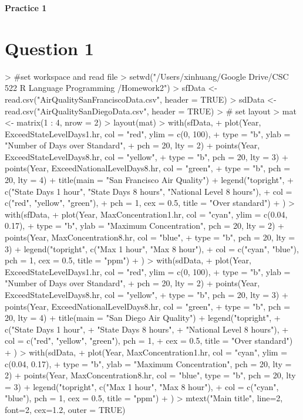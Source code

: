 \documentclass{article}
\begin{document}


\begin{center}
{\bf\Large Practice 1}
\end{center}

\section*{Question 1}
\begin{Schunk}
\begin{Sinput}
> #set workspace and read file
> setwd("/Users/xinhuang/Google Drive/CSC 522 R Language Programming /Homework2")
> sfData <- read.csv("AirQualitySanFranciscoData.csv", header = TRUE)
> sdData <- read.csv("AirQualitySanDiegoData.csv", header = TRUE)
> # set layout
> mat <- matrix(1 : 4, nrow = 2)
> layout(mat)
> with(sfData, {
+     plot(Year, ExceedStateLevelDays1.hr, col = "red", ylim = c(0, 100), 
+          type = "b", ylab = "Number of Days over Standard", 
+          pch = 20, lty = 2)
+     points(Year, ExceedStateLevelDays8.hr, col = "yellow", 
+            type = "b", pch = 20, lty = 3)
+     points(Year, ExceedNationalLevelDays8.hr, col = "green", 
+            type = "b", pch = 20, lty = 4)
+     title(main = "San Francisco Air Quality")
+     legend("topright", 
+            c("State Days 1 hour", "State Days 8 hours", "National Level 8 hours"),
+            col = c("red", "yellow", "green"),
+            pch = 1, cex = 0.5, title = "Over standard")
+ })
> with(sfData, {
+     plot(Year, MaxConcentration1.hr, col = "cyan", ylim = c(0.04, 0.17), 
+          type = "b", ylab = "Maximum Concentration", pch = 20, lty = 2)
+     points(Year, MaxConcentration8.hr, col = "blue", 
+            type = "b", pch = 20, lty = 3)
+     legend("topright", c("Max 1 hour", "Max 8 hour"),
+            col = c("cyan", "blue"), pch = 1, cex = 0.5, title = "ppm")
+ })
> with(sdData, {
+     plot(Year, ExceedStateLevelDays1.hr, col = "red", ylim = c(0, 100), 
+          type = "b", ylab = "Number of Days over Standard",
+          pch = 20, lty = 2)
+     points(Year, ExceedStateLevelDays8.hr, col = "yellow",
+            type = "b", pch = 20, lty = 3)
+     points(Year, ExceedNationalLevelDays8.hr, col = "green", 
+            type = "b", pch = 20, lty = 4)
+     title(main = "San Diego Air Quality")
+     legend("topright", 
+            c("State Days 1 hour", 
+              "State Days 8 hours", 
+              "National Level 8 hours"),
+            col = c("red", "yellow", "green"), pch = 1, 
+            cex = 0.5, title = "Over standard")
+ })
> with(sdData, {
+     plot(Year, MaxConcentration1.hr, col = "cyan", ylim = c(0.04, 0.17), 
+          type = "b", ylab = "Maximum Concentration", pch = 20, lty = 2)
+     points(Year, MaxConcentration8.hr, col = "blue", type = "b", pch = 20, lty = 3)
+     legend("topright", c("Max 1 hour", "Max 8 hour"),
+            col = c("cyan", "blue"), pch = 1, cex = 0.5, title = "ppm")
+ })
> mtext("Main title", line=2, font=2, cex=1.2, outer = TRUE)
\end{Sinput}
\end{Schunk}
\end{document}
